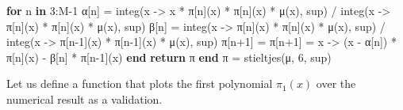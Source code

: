 \documentclass[
]{article}
\newenvironment{Shaded}{\begin{snugshade}}{\end{snugshade}}
\newcommand{\ConstantTok}[1]{\textcolor[rgb]{0.56,0.35,0.01}{#1}}
\newcommand{\ControlFlowTok}[1]{\textcolor[rgb]{0.00,0.23,0.31}{\textbf{#1}}}
\newcommand{\FloatTok}[1]{\textcolor[rgb]{0.68,0.00,0.00}{#1}}
\newcommand{\FunctionTok}[1]{\textcolor[rgb]{0.28,0.35,0.67}{#1}}
\newcommand{\KeywordTok}[1]{\textcolor[rgb]{0.00,0.23,0.31}{\textbf{#1}}}
\newcommand{\NormalTok}[1]{\textcolor[rgb]{0.00,0.23,0.31}{#1}}
\newcommand{\OperatorTok}[1]{\textcolor[rgb]{0.37,0.37,0.37}{#1}}
\begin{document}
\begin{Shaded}
\begin{Highlighting}[]
    \ControlFlowTok{for}\NormalTok{ n }\KeywordTok{in} \FloatTok{3}\OperatorTok{:}\NormalTok{M}\OperatorTok{{-}}\FloatTok{1}
\NormalTok{        α[n] }\OperatorTok{=} \FunctionTok{integ}\NormalTok{(x }\OperatorTok{{-}\textgreater{}}\NormalTok{ x }\OperatorTok{*} \ConstantTok{π}\NormalTok{[n](x) }\OperatorTok{*} \ConstantTok{π}\NormalTok{[n](x) }\OperatorTok{*} \FunctionTok{μ}\NormalTok{(x), sup) }\OperatorTok{/} \FunctionTok{integ}\NormalTok{(x }\OperatorTok{{-}\textgreater{}} \ConstantTok{π}\NormalTok{[n](x) }\OperatorTok{*} \ConstantTok{π}\NormalTok{[n](x) }\OperatorTok{*} \FunctionTok{μ}\NormalTok{(x), sup)}
\NormalTok{        β[n] }\OperatorTok{=} \FunctionTok{integ}\NormalTok{(x }\OperatorTok{{-}\textgreater{}} \ConstantTok{π}\NormalTok{[n](x) }\OperatorTok{*} \ConstantTok{π}\NormalTok{[n](x) }\OperatorTok{*} \FunctionTok{μ}\NormalTok{(x), sup) }\OperatorTok{/} \FunctionTok{integ}\NormalTok{(x }\OperatorTok{{-}\textgreater{}} \ConstantTok{π}\NormalTok{[n}\OperatorTok{{-}}\FloatTok{1}\NormalTok{](x) }\OperatorTok{*} \ConstantTok{π}\NormalTok{[n}\OperatorTok{{-}}\FloatTok{1}\NormalTok{](x) }\OperatorTok{*} \FunctionTok{μ}\NormalTok{(x), sup)}
        \ConstantTok{π}\NormalTok{[n}\OperatorTok{+}\FloatTok{1}\NormalTok{] }\OperatorTok{=} \ConstantTok{π}\NormalTok{[n}\OperatorTok{+}\FloatTok{1}\NormalTok{] }\OperatorTok{=}\NormalTok{ x }\OperatorTok{{-}\textgreater{}}\NormalTok{ (x }\OperatorTok{{-}}\NormalTok{ α[n]) }\OperatorTok{*} \ConstantTok{π}\NormalTok{[n](x) }\OperatorTok{{-}}\NormalTok{ β[n] }\OperatorTok{*} \ConstantTok{π}\NormalTok{[n}\OperatorTok{{-}}\FloatTok{1}\NormalTok{](x)}
    \ControlFlowTok{end}
    \ControlFlowTok{return} \ConstantTok{π}
\KeywordTok{end}
\ConstantTok{π} \OperatorTok{=} \FunctionTok{stieltjes}\NormalTok{(μ, }\FloatTok{6}\NormalTok{, sup)}
\end{Highlighting}
\end{Shaded}

Let us define a function that plots the first polynomial \(\pi_1(x)\)
over the numerical result as a validation.
\end{document}
